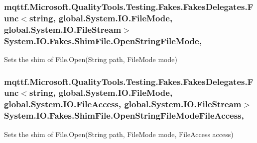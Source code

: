 \hypertarget{class_system_1_1_i_o_1_1_fakes_1_1_shim_file_ac7e9520ab5cdc2a43d1fe45d60a9a700}{
\subsubsection[{Open\-String\-File\-Mode}]{\setlength{\rightskip}{0pt plus 5cm}mqttf.\-Microsoft.\-Quality\-Tools.\-Testing.\-Fakes.\-Fakes\-Delegates.\-Func$<$string, global.\-System.\-I\-O.\-File\-Mode, global.\-System.\-I\-O.\-File\-Stream$>$ System.\-I\-O.\-Fakes.\-Shim\-File.\-Open\-String\-File\-Mode\hspace{0.3cm}{\ttfamily [static]}, {\ttfamily [set]}}}\label{class_system_1_1_i_o_1_1_fakes_1_1_shim_file_ac7e9520ab5cdc2a43d1fe45d60a9a700}


Sets the shim of File.\-Open(\-String path, File\-Mode mode)

\hypertarget{class_system_1_1_i_o_1_1_fakes_1_1_shim_file_ab77d3d8929a6e189898543d261995832}{
\subsubsection[{Open\-String\-File\-Mode\-File\-Access}]{\setlength{\rightskip}{0pt plus 5cm}mqttf.\-Microsoft.\-Quality\-Tools.\-Testing.\-Fakes.\-Fakes\-Delegates.\-Func$<$string, global.\-System.\-I\-O.\-File\-Mode, global.\-System.\-I\-O.\-File\-Access, global.\-System.\-I\-O.\-File\-Stream$>$ System.\-I\-O.\-Fakes.\-Shim\-File.\-Open\-String\-File\-Mode\-File\-Access\hspace{0.3cm}{\ttfamily [static]}, {\ttfamily [set]}}}\label{class_system_1_1_i_o_1_1_fakes_1_1_shim_file_ab77d3d8929a6e189898543d261995832}


Sets the shim of File.\-Open(\-String path, File\-Mode mode, File\-Access access)

